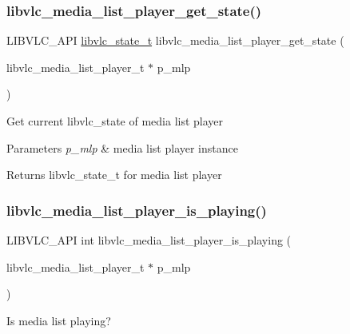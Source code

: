 \subsubsection{\texorpdfstring{libvlc\+\_\+media\+\_\+list\+\_\+player\+\_\+get\+\_\+state()}{libvlc\_media\_list\_player\_get\_state()}}
{\footnotesize\ttfamily L\+I\+B\+V\+L\+C\+\_\+\+A\+PI \hyperlink{group__libvlc__media_gac88ad60037ea05e1f23675a2ebe31efc}{libvlc\+\_\+state\+\_\+t} libvlc\+\_\+media\+\_\+list\+\_\+player\+\_\+get\+\_\+state (\begin{DoxyParamCaption}\item[{libvlc\+\_\+media\+\_\+list\+\_\+player\+\_\+t $\ast$}]{p\+\_\+mlp }\end{DoxyParamCaption})}

Get current libvlc\+\_\+state of media list player


\begin{DoxyParams}{Parameters}
{\em p\+\_\+mlp} & media list player instance \\
\hline
\end{DoxyParams}
\begin{DoxyReturn}{Returns}
libvlc\+\_\+state\+\_\+t for media list player 
\end{DoxyReturn}
\mbox{\label{group__libvlc__media__list__player_gaa325957bb8304d3898686b6bb8eaaec7}} 
\subsubsection{\texorpdfstring{libvlc\+\_\+media\+\_\+list\+\_\+player\+\_\+is\+\_\+playing()}{libvlc\_media\_list\_player\_is\_playing()}}
{\footnotesize\ttfamily L\+I\+B\+V\+L\+C\+\_\+\+A\+PI int libvlc\+\_\+media\+\_\+list\+\_\+player\+\_\+is\+\_\+playing (\begin{DoxyParamCaption}\item[{libvlc\+\_\+media\+\_\+list\+\_\+player\+\_\+t $\ast$}]{p\+\_\+mlp }\end{DoxyParamCaption})}

Is media list playing?


